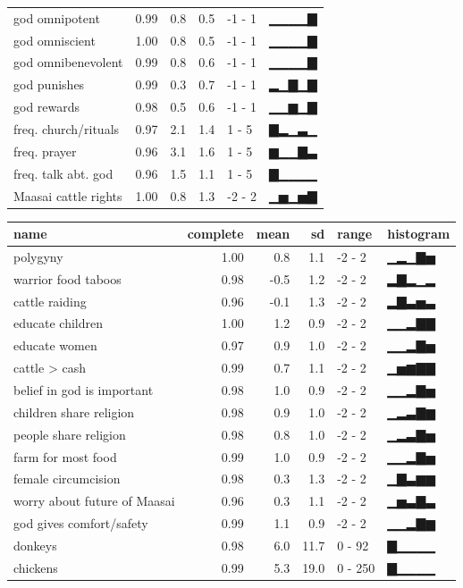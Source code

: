\documentclass[
  11pt,
]{article}
\begin{document}
\begin{landscape}
\begin{table}
\begin{tabular}{lrrrll}
god omnipotent & 0.99 & 0.8 & 0.5 & -1 - 1 & ▁▁▁▁▇\\
god omniscient & 1.00 & 0.8 & 0.5 & -1 - 1 & ▁▁▁▁▇\\
\addlinespace
god omnibenevolent & 0.99 & 0.8 & 0.6 & -1 - 1 & ▁▁▁▁▇\\
god punishes & 0.99 & 0.3 & 0.7 & -1 - 1 & ▂▁▇▁▇\\
god rewards & 0.98 & 0.5 & 0.6 & -1 - 1 & ▁▁▆▁▇\\
freq. church/rituals & 0.97 & 2.1 & 1.4 & 1 - 5 & ▇▂▁▃▁\\
freq. prayer & 0.96 & 3.1 & 1.6 & 1 - 5 & ▆▁▁▇▃\\
\addlinespace
freq. talk abt. god & 0.96 & 1.5 & 1.1 & 1 - 5 & ▇▁▁▁▁\\
Maasai cattle rights & 1.00 & 0.8 & 1.3 & -2 - 2 & ▁▅▁▅▇\\
\bottomrule
\end{tabular}
\centering
\begin{tabular}{lrrrll}
\toprule
name & complete & mean & sd & range & histogram\\
\midrule
polygyny & 1.00 & 0.8 & 1.1 & -2 - 2 & ▁▂▁▇▅\\
warrior food taboos & 0.98 & -0.5 & 1.2 & -2 - 2 & ▂▇▂▁▂\\
cattle raiding & 0.96 & -0.1 & 1.3 & -2 - 2 & ▂▇▃▅▃\\
educate children & 1.00 & 1.2 & 0.9 & -2 - 2 & ▁▁▂▇▇\\
educate women & 0.97 & 0.9 & 1.0 & -2 - 2 & ▁▁▂▇▅\\
\addlinespace
cattle > cash & 0.99 & 0.7 & 1.1 & -2 - 2 & ▁▅▆▇▇\\
belief in god is important & 0.98 & 1.0 & 0.9 & -2 - 2 & ▁▁▂▇▅\\
children share religion & 0.98 & 0.9 & 1.0 & -2 - 2 & ▁▂▃▇▆\\
people share religion & 0.98 & 0.8 & 1.0 & -2 - 2 & ▁▂▃▇▅\\
farm for most food & 0.99 & 1.0 & 0.9 & -2 - 2 & ▁▁▂▇▅\\
\addlinespace
female circumcision & 0.98 & 0.3 & 1.3 & -2 - 2 & ▁▇▃▆▆\\
worry about future of Maasai & 0.96 & 0.3 & 1.1 & -2 - 2 & ▁▅▃▇▃\\
god gives comfort/safety & 0.99 & 1.1 & 0.9 & -2 - 2 & ▁▁▂▇▆\\
donkeys & 0.98 & 6.0 & 11.7 & 0 - 92 & ▇▁▁▁▁\\
chickens & 0.99 & 5.3 & 19.0 & 0 - 250 & ▇▁▁▁▁\\

\end{tabular}
\end{table}
\end{landscape}
\end{document}
